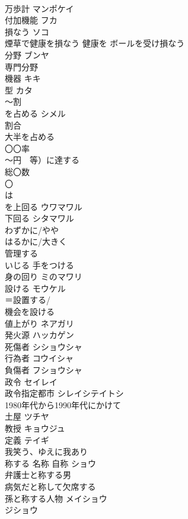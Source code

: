 \documentclass[8pt]{extreport}
\begin{document}
\begin{CJK}{UTF8}{min}
\\	万歩計	マンポケイ 
\\	付加機能	フカ 
\\	損なう	ソコ 
\\	煙草で健康を損なう 健康を ボールを受け損なう　
\\	分野	ブンヤ 
\\	専門分野
\\	機器	キキ 
\\	型	カタ 
\\	〜割
\\	を占める	シメル 
\\	割合	
\\	大半を占める	
\\	〇〇率	
\\	〜円　等）に達する	
\\	総〇数	
\\	〇
\\	は
\\	を上回る	ウワマワル 
\\	下回る	シタマワル 
\\	わずかに/やや	
\\	はるかに/大きく	
\\	管理する	
\\	いじる	手をつける 
\\	身の回り	ミのマワリ 
\\	設ける	モウケル 
\\	＝設置する/ 
\\	機会を設ける 
\\	値上がり	ネアガリ 
\\	発火源	ハッカゲン 
\\	死傷者	シショウシャ 
\\	行為者	コウイシャ 
\\	負傷者	フショウシャ 
\\	政令	セイレイ 
\\	政令指定都市	シレイシテイトシ 
\\	1980年代から1990年代にかけて	
\\	土屋	ツチヤ 
\\	教授	キョウジュ 
\\	定義	テイギ 
\\	我笑う、ゆえに我あり	
\\	称する 名称 自称	ショウ 
\\	弁護士と称する男 
\\	病気だと称して欠席する 
\\	孫と称する人物 メイショウ 
\\	ジショウ 

\end{CJK}
\end{document}

